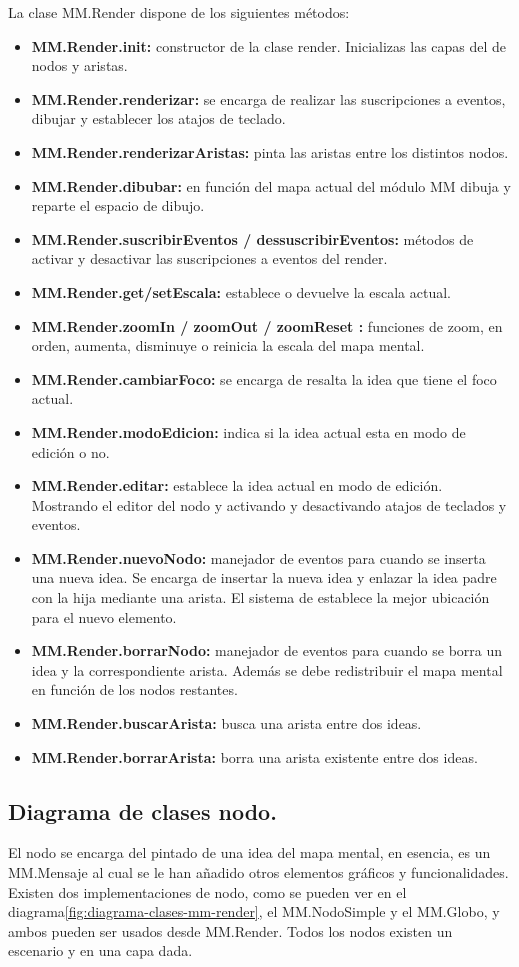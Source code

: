 La clase MM.Render dispone de los siguientes métodos: 
\begin{itemize}
\item \textbf{MM.Render.init:} constructor de la clase render. Inicializas las capas del de nodos y aristas. 
\item \textbf{MM.Render.renderizar:} se encarga de realizar las suscripciones a eventos, dibujar y establecer los atajos de teclado.
\item \textbf{MM.Render.renderizarAristas:} pinta las aristas entre los distintos nodos.
\item \textbf{MM.Render.dibubar:} en función del mapa actual del módulo MM dibuja y reparte el espacio de dibujo.
\item \textbf{MM.Render.suscribirEventos / dessuscribirEventos:} métodos de activar y desactivar las suscripciones a eventos del render.  
\item \textbf{MM.Render.get/setEscala:} establece o devuelve la escala actual.
\item \textbf{MM.Render.zoomIn / zoomOut / zoomReset :} funciones de zoom, en orden, aumenta, disminuye o reinicia la escala del mapa mental.
\item \textbf{MM.Render.cambiarFoco:} se encarga de resalta la idea que tiene el foco actual.
\item \textbf{MM.Render.modoEdicion:} indica si la idea actual esta en modo de edición o no.
\item \textbf{MM.Render.editar:} establece la idea actual en modo de edición. Mostrando el editor del nodo y activando y desactivando atajos de teclados y eventos.
\item \textbf{MM.Render.nuevoNodo:} manejador de eventos para cuando se inserta una nueva idea. Se encarga de insertar la nueva idea y enlazar la idea padre con la hija mediante una arista. El sistema de establece la mejor ubicación para el nuevo elemento.
\item \textbf{MM.Render.borrarNodo:} manejador de eventos para cuando se borra un idea y la correspondiente arista. Además se debe redistribuir el mapa mental en función de los nodos restantes.
\item \textbf{MM.Render.buscarArista:} busca una arista entre dos ideas.
\item \textbf{MM.Render.borrarArista:} borra una arista existente entre dos ideas.
\end{itemize}



\subsection{Diagrama de clases nodo.}
El nodo se encarga del pintado de una idea del mapa mental, en esencia, es un MM.Mensaje al cual se le han añadido otros elementos gráficos y funcionalidades. Existen dos implementaciones de nodo, como se pueden ver en el diagrama\ref{fig:diagrama-clases-mm-render}, el MM.NodoSimple y el MM.Globo, y ambos pueden ser usados desde MM.Render. Todos los nodos existen un escenario y en una capa dada. 

